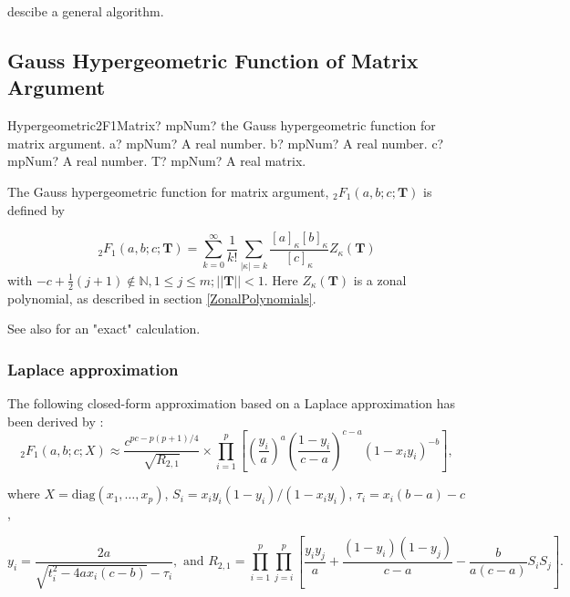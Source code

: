 \cite{James_1964, James_1968, McLaren_1976} descibe a general algorithm.









\newpage
\subsection{Gauss Hypergeometric Function of Matrix Argument}
\label{sec:Hypergeometric2F2Matrix}


\begin{mpFunctionsExtract}
	\mpFunctionFourNotImplemented
	{Hypergeometric2F1Matrix? mpNum? the Gauss hypergeometric function for matrix argument.}
	{a? mpNum? A real number.}
	{b? mpNum? A real number.}	
	{c? mpNum? A real number.}
	{T? mpNum? A real matrix.}	
\end{mpFunctionsExtract}


\vspace{0.3cm}


The Gauss hypergeometric function for matrix argument, ${}_2F_1(a, b; c; \textbf{T})$ is defined by \citep{NIST}

\begin{equation}
	{}_2F_1(a,b;c;\textbf{T}) = \sum_{k=0}^\infty \frac{1}{k!}  \sum_{|\kappa|=k}  \frac{\left[a\right]_{\kappa}\left[b\right]_{\kappa}}{\left[c\right]_{\kappa}} Z_{\kappa}(\textbf{T})
\end{equation}
with $-c+\tfrac{1}{2}(j+1) \notin  \mathbb{N}, 1 \leq j \leq m; ||\textbf{T}||<1$. Here $Z_{\kappa}(\textbf{T})$ is a zonal polynomial, as described in section \ref{ZonalPolynomials}.

See also \cite{Koev_2006} for an "exact" calculation.


\subsubsection{Laplace approximation}
The following closed-form approximation based on a Laplace approximation has been derived by \cite{Butler_Wood_2002}:
\begin{equation}
	{}_2{F}_1(a,b;c;X)  \approx \frac{c^{pc-p(p+1)/4}}{\sqrt{R_{2,1}}}   \times \prod_{i=1}^p \left[\left(\frac{y_i}{a}\right)^a \left(\frac{1-y_i}{c-a} \right)^{c-a} (1-x_i y_i)^{-b}  \right],
\end{equation}
\begin{center}
	where $X=\text{diag}(x_1,\ldots,x_p)$, $S_i = x_i y_i (1-y_i)/(1-x_i y_i)$, $\tau_i = x_i(b-a)-c$,
\end{center}
\begin{equation*}
	y_i=\frac{2a}{\sqrt{t_i^2 - 4ax_i(c-b)}-\tau_i}, \text{ and } R_{2,1} = \prod_{i=1}^p  \prod_{j=i}^p \left[\frac{y_i y_j}{a}+\frac{(1-y_i)(1-y_j)}{c-a}-\frac{b}{a(c-a)} S_i S_j   \right]. 
\end{equation*}












